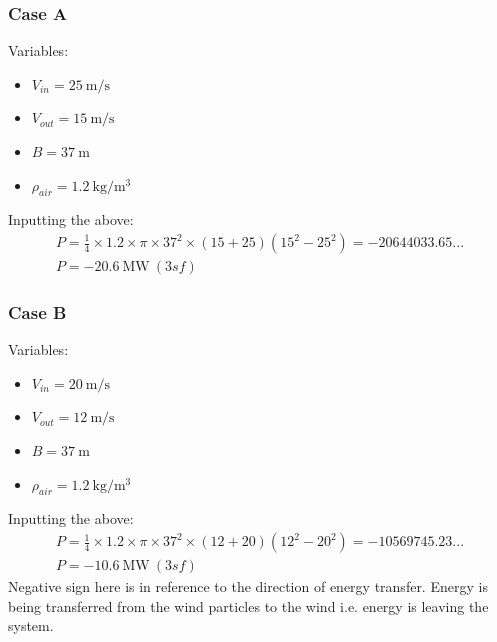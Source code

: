 \documentclass[12pt]{article}
\numberwithin{equation}{section}
\begin{document}
\begin{flushleft}
\subsubsection{Case A}
Variables:
\begin{itemize}
  \item $V_{in} = 25 \ \si{\meter\per\second}$
  \item $V_{out} = 15 \ \si{\meter\per\second}$
  \item $B = 37 \ \si{\meter}$
  \item $\rho_{air} = 1.2 \ \si{\kg\per\meter\cubed}$
\end{itemize}
Inputting the above:
\begin{gather}
  P = \frac{1}{4} \times 1.2 \times \pi \times 37^2 \times (15 + 25)(15^2 - 25^2) = -20644033.65...\\
  P = -20.6 \ \si{\mega\watt} \ (3sf)
\end{gather}
\subsubsection{Case B}
Variables:
\begin{itemize}
  \item $V_{in} = 20 \ \si{\meter\per\second}$
  \item $V_{out} = 12 \ \si{\meter\per\second}$
  \item $B = 37 \ \si{\meter}$
  \item $\rho_{air} = 1.2 \ \si{\kg\per\meter\cubed}$
\end{itemize}
Inputting the above:
\begin{gather}
  P = \frac{1}{4} \times 1.2 \times \pi \times 37^2 \times (12 + 20)(12^2 - 20^2) = -10569745.23...\\
  P = -10.6 \ \si{\mega\watt} \ (3sf)
\end{gather}
Negative sign here is in reference to the direction of energy transfer. Energy is being transferred from the wind particles to the wind i.e. energy is leaving the system. 


\end{flushleft}
\end{document}
